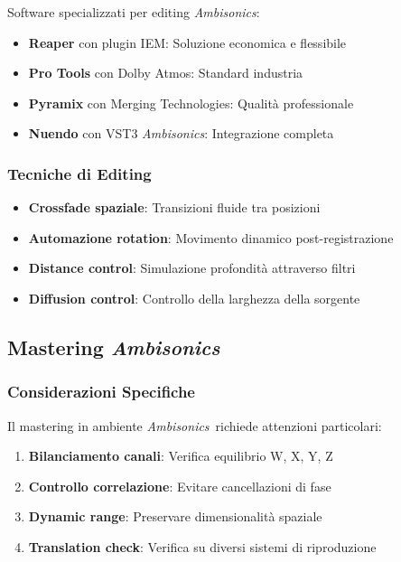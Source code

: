 \documentclass[a4paper,11pt,openany]{book}
\newcommand{\ambisonics}{\textit{Ambisonics}}
\begin{document}
Software specializzati per editing \ambisonics:

\begin{itemize}
    \item \textbf{Reaper} con plugin IEM: Soluzione economica e flessibile
    \item \textbf{Pro Tools} con Dolby Atmos: Standard industria
    \item \textbf{Pyramix} con Merging Technologies: Qualità professionale
    \item \textbf{Nuendo} con VST3 \ambisonics: Integrazione completa
\end{itemize}

\subsubsection{Tecniche di Editing}

\begin{itemize}
    \item \textbf{Crossfade spaziale}: Transizioni fluide tra posizioni
    \item \textbf{Automazione rotation}: Movimento dinamico post-registrazione
    \item \textbf{Distance control}: Simulazione profondità attraverso filtri
    \item \textbf{Diffusion control}: Controllo della larghezza della sorgente
\end{itemize}

\subsection{Mastering \ambisonics}

\subsubsection{Considerazioni Specifiche}

Il mastering in ambiente \ambisonics\ richiede attenzioni particolari:

\begin{enumerate}
    \item \textbf{Bilanciamento canali}: Verifica equilibrio W, X, Y, Z
    \item \textbf{Controllo correlazione}: Evitare cancellazioni di fase
    \item \textbf{Dynamic range}: Preservare dimensionalità spaziale
    \item \textbf{Translation check}: Verifica su diversi sistemi di riproduzione
\end{enumerate}
\end{document}
